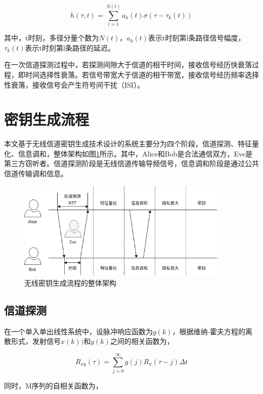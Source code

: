 \documentclass[master]{seuthesis} %
\begin{document}
\begin{Main}
\begin{equation}
    h(\tau, t) = \sum_{l = 1}^{N(t)} a_k(t) \sigma(\tau - \tau_k(t))
\end{equation}

其中，t时刻，多径分量个数为$N(t)$，$a_k(t)$表示t时刻第l条路径信号幅度，$\tau_k(t)$表示t时刻第l条路径的延迟。

在一次信道探测过程中，若探测间隙大于信道的相干时间，接收信号经历快衰落过程，即时间选择性衰落。若信号带宽大于信道的相干带宽，接收信号经历频率选择性衰落，接收信号会产生符号间干扰（ISI）。


\section{密钥生成流程}

本文基于无线信道密钥生成技术设计的系统主要分为四个阶段，信道探测、特征量化、信息调和，整体架构如图\ref{whole_structure}所示。其中，Alice和Bob是合法通信双方，Eve是第三方窃听者。信道探测阶段是无线信道传输导频信号，信息调和阶段是通过公共信道传输调和信息。

\begin{figure}[htbp!]
    \centering \includegraphics[width=0.9\textwidth]{images/whole_structure} 
    \caption{无线密钥生成流程的整体架构}
    \label{whole_structure}
\end{figure}

\subsection{信道探测}

在一个单入单出线性系统中，设脉冲响应函数为$g(k)$，根据维纳-霍夫方程的离散形式，发射信号$x(k))$和$y(k)$之间的相关函数为，

\begin{equation}
    R_{xy}(\tau)  = \sum_{j=0}^{\infty} g(j) R_x(\tau-j)\Delta t
\end{equation}

同时，M序列的自相关函数为，


\end{Main}
\end{document}
